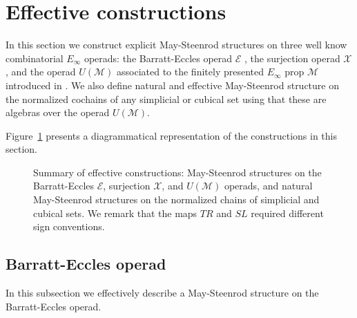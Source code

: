 
\section{Effective constructions} \label{s:effective}	

In this section we construct explicit May-Steenrod structures on three well know combinatorial $E_\infty$ operads: the Barratt-Eccles operad $\mathcal E$ \cite{berger04combinatorial}, the surjection operad $\mathcal X$ \cite{mcclure03cochain}, and the operad $U(\mathcal M)$ associated to the finitely presented $E_\infty$ prop $\mathcal M$ introduced in \cite{medina2020prop1}.
We also define natural and effective May-Steenrod structure on the normalized cochains of any simplicial or cubical set using that these are algebras over the operad $U(\mathcal M)$.

Figure~\ref{fig: bigsummary} presents a diagrammatical representation of the constructions in this section.

\begin{figure}
	\caption{Summary of effective constructions: May-Steenrod structures on the Barratt-Eccles $\mathcal E$, surjection $\mathcal X$, and $U(\mathcal M)$ operads, and natural May-Steenrod structures on the normalized chains of simplicial and cubical sets. We remark that the maps $TR$ and $SL$ required different sign conventions.}
	\label{fig: bigsummary}
\end{figure}

\subsection{Barratt-Eccles operad} In this subsection we effectively describe a May-Steenrod structure on the Barratt-Eccles operad.

